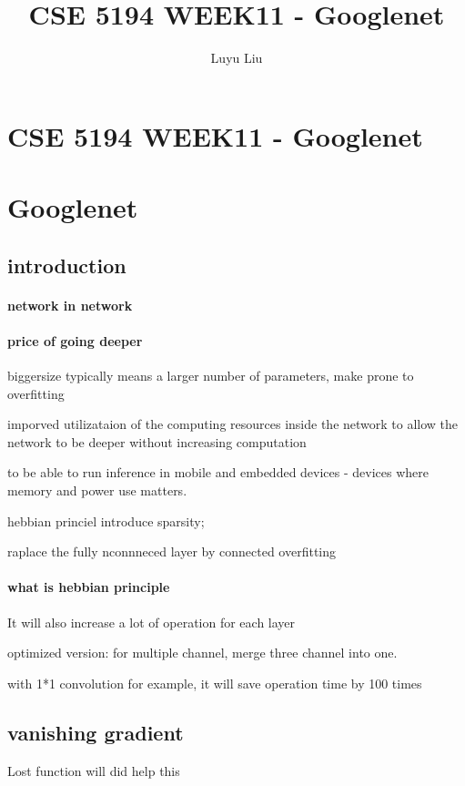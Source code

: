 \documentclass[12pt]{article}
\begin{document}
\author{Luyu Liu}

\newcommand\para{\par\refstepcounter{para}\thepara\space}

\section*{CSE 5194 WEEK11 - Googlenet}
\title{CSE 5194 WEEK11 - Googlenet}
\section{Googlenet}

\subsection{introduction}
\paragraph{network in network}

\paragraph{price of going deeper}
biggersize typically means a larger number of parameters, make prone to overfitting

imporved utilizataion of the computing resources inside the network
to allow the network to be deeper without increasing computation

to be able to run inference in mobile and embedded devices - devices where memory and power use matters.

hebbian princiel introduce sparsity;

raplace the fully nconnneced layer by connected overfitting

\paragraph{what is hebbian principle} 

It will also increase a lot of operation for each layer

optimized version: for multiple channel, merge three channel into one.

with 1*1 convolution for example, it will save operation time by 100 times

\subsection{vanishing gradient}
Lost function will did help this
\end{document}
